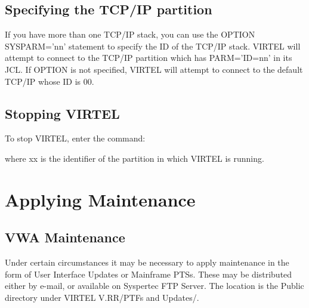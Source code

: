 \documentclass[letterpaper,10pt,english]{sphinxmanual}
\begin{document}
\subsection{Specifying the TCP/IP partition}
\label{\detokenize{Installation_Guide:specifying-the-tcp-ip-partition}}
If you have more than one TCP/IP stack, you can use the OPTION SYSPARM=’nn’ statement to specify the ID of the TCP/IP stack. VIRTEL will attempt to connect to the TCP/IP partition which has PARM=’ID=nn’ in its JCL. If OPTION is not specified, VIRTEL will attempt to connect to the default TCP/IP whose ID is 00.


\subsection{Stopping VIRTEL}
\label{\detokenize{Installation_Guide:id3}}
To stop VIRTEL, enter the command:

\begin{sphinxVerbatim}[commandchars=\\\{\}]
 
\end{sphinxVerbatim}

where xx is the identifier of the partition in which VIRTEL is running.

\newpage

\ignorespaces 

\section{Applying Maintenance}
\label{\detokenize{Installation_Guide:index-19}}\label{\detokenize{Installation_Guide:id4}}

\subsection{VWA Maintenance}
\label{\detokenize{Installation_Guide:vwa-maintenance}}
Under certain circumstances it may be necessary to apply maintenance in the form of User Interface Updates or Mainframe PTSs. These may be distributed either by e-mail, or available on Syspertec FTP Server. The location is the Public directory under VIRTEL V.RR/PTFs and Updates/.
\end{document}
